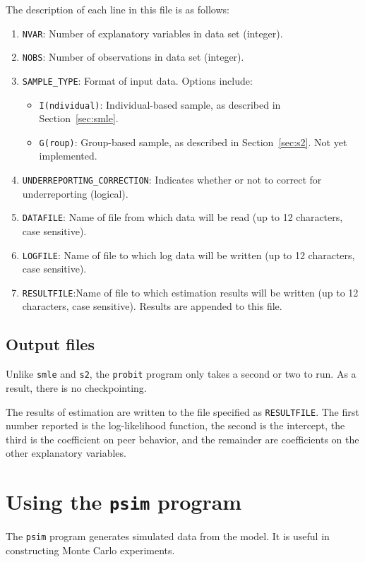 \documentclass{article}
\begin{document}
The description of each line in this file is as follows:
\begin{enumerate}
\item {\tt NVAR}: Number of explanatory variables in data set (integer).
\item {\tt NOBS}: Number of observations in data set (integer).
\item {\tt SAMPLE\_TYPE}: Format of input data.  Options include:
	\begin{itemize}
		\item {\tt I(ndividual)}: Individual-based sample, as described in Section~\ref{sec:smle}.
		\item {\tt G(roup)}: Group-based sample, as described in Section~\ref{sec:s2}.  Not yet implemented.
	\end{itemize}
\item {\tt UNDERREPORTING\_{}CORRECTION}: Indicates whether or not to correct for underreporting (logical).
\item {\tt DATAFILE}: Name of file from which data will be read (up to 12 characters, case sensitive).
\item {\tt LOGFILE}: Name of file to which log data will be written (up to 12 characters, case sensitive).
\item {\tt RESULTFILE}:Name of file to which estimation results will be written (up to 12 characters, case sensitive).  	Results	are appended to this file.
\end{enumerate}

\subsection{Output files}

Unlike {\tt smle} and {\tt s2}, the {\tt probit} program only takes a second or two to 
run.  As a result, there is no checkpointing.

The results of estimation are written to the file specified as {\tt RESULTFILE}.
The first number reported is the log-likelihood function, the second is the intercept,
the third is the coefficient on peer behavior, and the remainder are coefficients
on the other explanatory variables.


\section{Using the {\tt psim} program}

The {\tt psim} program generates simulated data from the model.  It is useful
in constructing Monte Carlo experiments.
\end{document}

